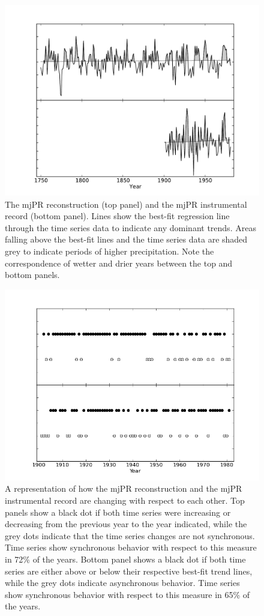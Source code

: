 \begin{figure}
\centering
\includegraphics[width=5in]{figures/wetdry.pdf}
\caption{The mjPR reconstruction (top panel) and the mjPR instrumental record (bottom panel). Lines show the best-fit regression line through the time series data to indicate any dominant trends. Areas falling above the best-fit lines and the time series data are shaded grey to indicate periods of higher precipitation. Note the correspondence of wetter and drier years between the top and bottom panels.}
\label{fig:wetdry}
\end{figure}

\begin{figure}
\centering
\includegraphics[width=5in]{figures/wetdry_dots.png}
\caption{A representation of how the mjPR reconstruction and the mjPR instrumental record are changing with respect to each other. Top panels show a black dot if both time series were increasing or decreasing from the previous year to the year indicated, while the grey dots indicate that the time series changes are not synchronous. Time series show synchronous behavior with respect to this measure in 72\% of the years. Bottom panel shows a black dot if both time series are either above or below their respective best-fit trend lines, while the grey dots indicate asynchronous behavior. Time series show synchronous behavior with respect to this measure in 65\% of the years.}
\label{fig:wetdry_dots}
\end{figure}

